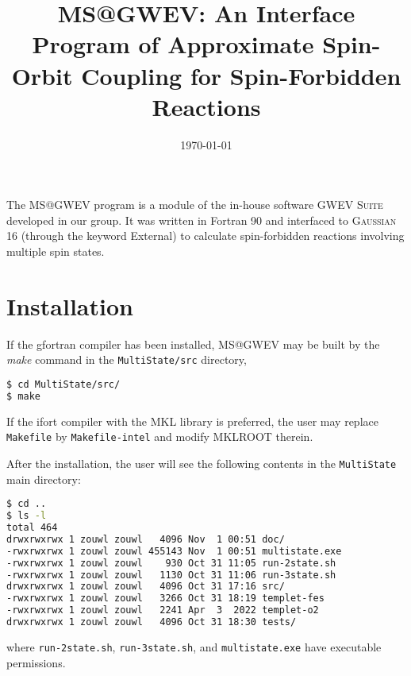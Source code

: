 \documentclass[UTF8]{article}
\title{MS@GWEV: An Interface Program of Approximate Spin-Orbit Coupling for Spin-Forbidden Reactions}
\date{\today}
\begin{document}
\maketitle

\vspace{10mm}
\tableofcontents

\newpage

The MS@GWEV program is a module of the in-house software \textsc{GWEV Suite} developed in our group.
It was written in Fortran 90 and interfaced to \textsc{Gaussian} 16 (through the keyword \textsf{External}) to calculate spin-forbidden reactions involving multiple spin states.

\section{Installation}

If the \textsf{gfortran} compiler has been installed, MS@GWEV may be built by the \textsl{make} command in the \verb|MultiState/src| directory,
\begin{lstlisting}[language=bash,numbers=none,backgroundcolor=\color{black},basicstyle=\tt\small\color{white},deletekeywords={cd}]
$ cd MultiState/src/
$ make
\end{lstlisting}

If the \textsf{ifort} compiler with the \textsf{MKL} library is preferred, the user may replace \verb|Makefile| by \verb|Makefile-intel| and modify \textsf{MKLROOT} therein.

After the installation, the user will see the following contents in the \verb|MultiState| main directory:
\begin{lstlisting}[language=bash,numbers=none,backgroundcolor=\color{black},basicstyle=\tt\small\color{white},
alsoletter={.-},deletekeywords={cd},
classoffset=0,morekeywords={run-2state.sh, run-3state.sh, multistate.exe},keywordstyle=\color{green},
classoffset=1,morekeywords={doc, src, tests},keywordstyle=\color{blue!50!white},
classoffset=0]
$ cd ..
$ ls -l
total 464
drwxrwxrwx 1 zouwl zouwl   4096 Nov  1 00:51 doc/
-rwxrwxrwx 1 zouwl zouwl 455143 Nov  1 00:51 multistate.exe
-rwxrwxrwx 1 zouwl zouwl    930 Oct 31 11:05 run-2state.sh
-rwxrwxrwx 1 zouwl zouwl   1130 Oct 31 11:06 run-3state.sh
drwxrwxrwx 1 zouwl zouwl   4096 Oct 31 17:16 src/
-rwxrwxrwx 1 zouwl zouwl   3266 Oct 31 18:19 templet-fes
-rwxrwxrwx 1 zouwl zouwl   2241 Apr  3  2022 templet-o2
drwxrwxrwx 1 zouwl zouwl   4096 Oct 31 18:30 tests/
\end{lstlisting}
where \verb|run-2state.sh|, \verb|run-3state.sh|, and \verb|multistate.exe| have executable permissions.
\end{document}
